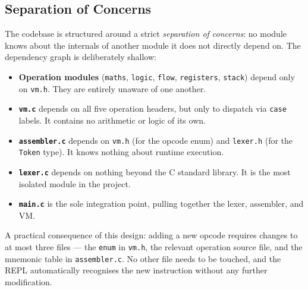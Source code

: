 \subsection{Separation of Concerns}

The codebase is structured around a strict \textit{separation of concerns}: no module knows about the internals of another module it does not directly depend on. The dependency graph is deliberately shallow:

\begin{itemize}
    \item \textbf{Operation modules} (\texttt{maths}, \texttt{logic}, \texttt{flow}, \texttt{registers}, \texttt{stack}) depend only on \texttt{vm.h}. They are entirely unaware of one another.
    \item \textbf{\texttt{vm.c}} depends on all five operation headers, but only to dispatch via \texttt{case} labels. It contains no arithmetic or logic of its own.
    \item \textbf{\texttt{assembler.c}} depends on \texttt{vm.h} (for the opcode enum) and \texttt{lexer.h} (for the \texttt{Token} type). It knows nothing about runtime execution.
    \item \textbf{\texttt{lexer.c}} depends on nothing beyond the C standard library. It is the most isolated module in the project.
    \item \textbf{\texttt{main.c}} is the sole integration point, pulling together the lexer, assembler, and VM.
\end{itemize}

A practical consequence of this design: adding a new opcode requires changes to at most three files — the \texttt{enum} in \texttt{vm.h}, the relevant operation source file, and the mnemonic table in \texttt{assembler.c}. No other file needs to be touched, and the REPL automatically recognises the new instruction without any further modification.